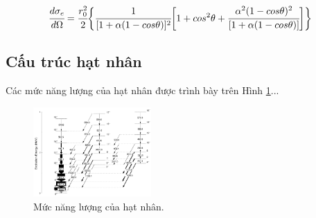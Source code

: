 \documentclass[11pt, a4paper, bold, center, twoside, journal]{paper}
\begin{document}
\begin{equation}
\cfrac{d \sigma_{e}}{d \Omega} = \cfrac{r_{0}^{2}}{2} 
\biggl\{
	\cfrac{1}{[1+\alpha(1-cos\theta)]^{2}}
	\biggl [
	1+cos^{2}\theta+\cfrac{\alpha^{2}(1-cos\theta)^{2}} {[1+\alpha(1-cos\theta)]}
	\biggr ]
\biggr\}
\label{equ:compton}
\end{equation}

\vspace{\parskip}
\begin{multicols}{2}%



\subsection{Cấu trúc hạt nhân}
Các mức năng lượng của hạt nhân được trình bày trên Hình \ref{fig:nangluong}...



\end{multicols}%

\begin{figure}[!htb]
\centering
	\includegraphics[width=0.4\textwidth]{figure/156Gd.png}
	\caption{Mức năng lượng của hạt nhân.}
	\label{fig:nangluong}
\end{figure}
\end{document}
